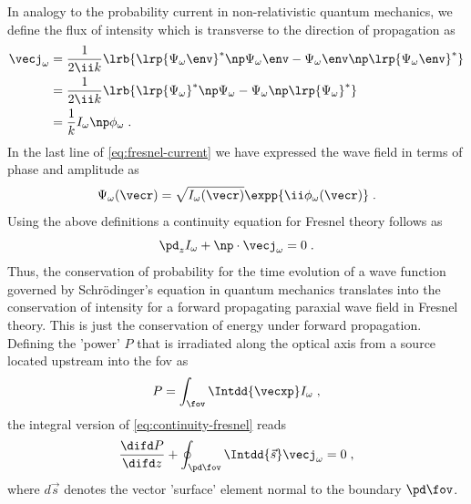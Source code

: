 \documentclass[
twoside,
openright,
titlepage,
numbers=noenddot,
headinclude,
fleqn,
a4paper,
footinclude=true,
cleardoublepage=empty,
abstractoff,
BCOR=5mm,
paper=a4,
fontsize=11pt,
british,ngerman,american,
]{scrreprt}
\begin{document}
In analogy to the probability current in non-relativistic quantum
mechanics, we define the flux of intensity which is transverse to the
direction of propagation as
\begin{equation}
  \label{eq:fresnel-current}
  \begin{split}
      \vecj_\omega 
      & =  \frac{1}{2\ii k}\lrb{ \lrp{ 
          \Psi_\omega\env}^* \np \Psi_\omega\env 
        - \Psi_\omega\env \np \lrp{\Psi_\omega\env}^* }
      \\ & =  \frac{1}{2\ii k}\lrb{ \lrp{ 
          \Psi_\omega}^* \np \Psi_\omega 
        - \Psi_\omega \np \lrp{\Psi_\omega}^* }
      \\ & = \frac{1}{k} I_\omega\np\phi_\omega \;.
  \end{split}
\end{equation}
In the last line of \cref{eq:fresnel-current} we have expressed the
wave field in terms of  phase and amplitude as
\begin{equation}
  \label{eq:amplitude-phase}
  \Psi_\omega(\vecr)=\sqrt{I_\omega(\vecr)}\expp{\ii\phi_\omega(\vecr)} \;.
\end{equation}
Using the above definitions a continuity equation for Fresnel theory
follows as
\begin{equation}
  \label{eq:continuity-fresnel}
  \pd_z I_\omega + \np\cdot\vecj_\omega = 0 \;.
\end{equation}
Thus, the conservation of probability for the time evolution of a wave
function governed by Schrödinger's equation in quantum mechanics
translates into the conservation of intensity for a forward
propagating paraxial wave field in Fresnel theory.  This is just the
conservation of energy under forward propagation.  Defining the
'power' $P$ that is irradiated along the optical axis from a source
located upstream into the \acf{fov} as
\begin{equation}
  \label{eq:power}
  P = \int_\fov\Intdd{\vecxp} I_\omega \;,
\end{equation}
the integral version of \cref{eq:continuity-fresnel}  reads
\begin{equation}
  \label{eq:continuity-fresnel-integral}
  \frac{\difd P}{\difd z} 
  + \oint_{\pd\fov}\Intdd{\vec{s}}\vecj_\omega = 0 \;,
\end{equation}
where $d\vec{s}$ denotes the vector 'surface' element normal to the
boundary $\pd\fov$.
\end{document}
